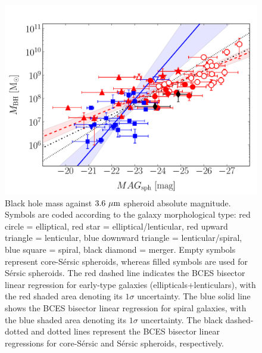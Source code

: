 \documentclass[preprint2]{emulateapj}
\begin{document}
\begin{figure}[h]
\begin{center}
\includegraphics[width=\columnwidth]{images/mbh_vs_mag_sph.pdf}
\caption{Black hole mass against $3.6\rm~\mu m$ spheroid absolute magnitude. 
Symbols are coded according to the galaxy morphological type: red circle = elliptical, red star = elliptical/lenticular, 
red upward triangle = lenticular, blue downward triangle = lenticular/spiral, blue square = spiral, black diamond = merger. 
Empty symbols represent core-S\'ersic spheroids, whereas filled symbols are used for S\'ersic spheroids. 
The red dashed line indicates the BCES bisector linear regression for early-type galaxies (ellipticals+lenticulars), 
with the red shaded area denoting its $1\sigma$ uncertainty. 
The blue solid line shows the BCES bisector linear regression for spiral galaxies, 
with the blue shaded area denoting its $1\sigma$ uncertainty. 
The black dashed-dotted and dotted lines represent the BCES bisector linear regressions for core-S\'ersic and S\'ersic spheroids, respectively.}
\label{fig:mbhmagsph}
\end{center}
\end{figure}
\end{document}
